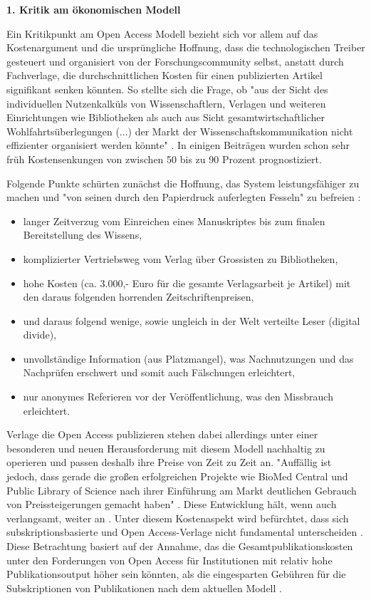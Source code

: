 \textbf{1. Kritik am ökonomischen Modell}

Ein Kritikpunkt am Open Access Modell bezieht sich vor allem auf das Kostenargument und die ursprüngliche Hoffnung, dass die technologischen Treiber gesteuert und organisiert von der Forschungscommunity selbst, anstatt durch Fachverlage, die durchschnittlichen Kosten für einen publizierten Artikel signifikant senken könnten. So stellte sich die Frage, ob "aus der Sicht des individuellen Nutzenkalküls von Wissenschaftlern, Verlagen und weiteren Einrichtungen wie Bibliotheken als auch aus Sicht gesamtwirtschaftlicher Wohlfahrtsüberlegungen (...) der Markt der Wissenschaftskommunikation nicht effizienter organisiert werden könnte" \cite{Hess_2006}. In einigen Beiträgen wurden schon sehr früh Kostensenkungen von zwischen 50 bis zu 90 Prozent \cite{hilf_2004} \cite[:64]{cite:5} prognostiziert.

Folgende Punkte schürten zunächst die Hoffnung, das System leistungsfähiger zu machen und "von seinen durch den Papierdruck auferlegten Fesseln" zu befreien \cite{hilf_2004}:
\begin{itemize}
\item langer Zeitverzug vom Einreichen eines Manuskriptes bis zum finalen Bereitstellung des Wissens,
\item komplizierter Vertriebsweg vom Verlag über Grossisten zu Bibliotheken,
\item hohe Kosten (ca. 3.000,- Euro für die gesamte Verlagsarbeit je Artikel) mit den daraus folgenden horrenden Zeitschriftenpreisen,
\item und daraus folgend wenige, sowie ungleich in der Welt verteilte Leser (digital divide),
\item unvollständige Information (aus Platzmangel), was Nachnutzungen und das Nachprüfen erschwert und somit auch Fälschungen erleichtert,
\item nur anonymes Referieren vor der Veröffentlichung, was den Missbrauch erleichtert.
\end{itemize}

Verlage die Open Access publizieren stehen dabei allerdings unter einer besonderen und neuen Herausforderung mit diesem Modell nachhaltig zu operieren und passen deshalb ihre Preise von Zeit zu Zeit an. "Auffällig ist jedoch, dass gerade die großen erfolgreichen Projekte wie BioMed Central und Public Library of Science nach ihrer Einführung am Markt deutlichen Gebrauch von Preissteigerungen gemacht haben" \cite{schmidt_2007_goldenen}. Diese Entwicklung hält, wenn auch verlangsamt, weiter an \cite{suchen}. Unter diesem Kostenaspekt wird befürchtet, dass sich subskriptionsbasierte und Open Access-Verlage nicht fundamental unterscheiden \cite{schmidt_2007_goldenen}. Diese Betrachtung basiert auf der Annahme, das die Gesamtpublikationskosten unter den Forderungen von Open Access für Institutionen mit relativ hohe Publikationsoutput höher sein könnten, als die eingesparten Gebühren für die Subskriptionen von Publikationen nach dem aktuellen Modell \cite{mueller-langer_2010}.


